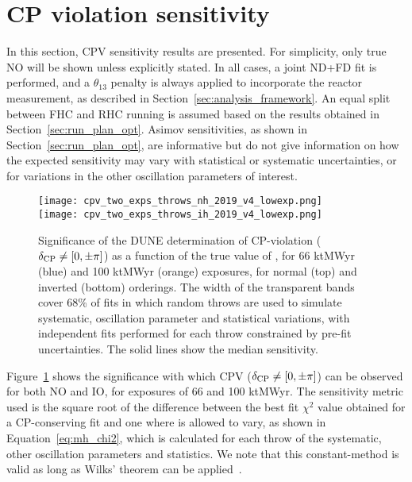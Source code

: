 \FloatBarrier
\section{CP violation sensitivity}
\label{sec:cp_sens}

In this section, CPV sensitivity results are presented. For simplicity, only true NO will be shown unless explicitly stated. In all cases, a joint ND+FD fit is performed, and a $\theta_{13}$ penalty is always applied to incorporate the reactor measurement, as described in Section~\ref{sec:analysis_framework}. An equal split between FHC and RHC running is assumed based on the results obtained in Section~\ref{sec:run_plan_opt}. Asimov sensitivities, as shown in Section~\ref{sec:run_plan_opt}, are informative but do not give information on how the expected sensitivity may vary with statistical or systematic uncertainties, or for variations in the other oscillation parameters of interest.

\begin{figure}[htbp]
  \centering
  \texttt{[image: cpv\_two\_exps\_throws\_nh\_2019\_v4\_lowexp.png]}\\
  \texttt{[image: cpv\_two\_exps\_throws\_ih\_2019\_v4\_lowexp.png]}
  \caption{Significance of the DUNE determination of CP-violation ($\delta_{\rm CP} \neq [0,\pm\pi]$) as a function of the true value of \deltacp, for 66 ktMWyr (blue) and 100 ktMWyr (orange) exposures, for normal (top) and inverted (bottom) orderings. The width of the transparent bands cover 68\% of fits in which random throws are used to simulate systematic, oscillation parameter and statistical variations, with independent fits performed for each throw constrained by pre-fit uncertainties. The solid lines show the median sensitivity.}
  \label{fig:cpv_bands}
\end{figure}
Figure~\ref{fig:cpv_bands} shows the significance with which CPV ($\delta_{\rm CP} \neq [0, \pm\pi]$) can be observed for both NO and IO, for exposures of 66 and 100 ktMWyr.  The sensitivity metric used is the square root of the difference between the best fit $\chi^{2}$ value obtained for a CP-conserving fit and one where \deltacp is allowed to vary, as shown in Equation~\ref{eq:mh_chi2}, which is calculated for each throw of the systematic, other oscillation parameters and statistics. We note that this constant-\dchisq method is valid as long as Wilks' theorem can be applied~\cite{wilks}.

